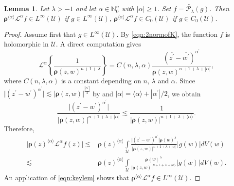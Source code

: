 \documentclass{amsart}
\newtheorem{lemma}[theorem]{Lemma}
\numberwithin{equation}{section}
\newcommand{\bfL}{\mathcal{L}}
\newcommand{\calU}{\mathcal{U}}
\newcommand{\bfrho}{\boldsymbol{\rho}}
\begin{document}
\begin{lemma}\label{lem:P_lambda}
Let $\lambda>-1$ and let $\alpha\in \mathbb{N}_0^n$ with $|\alpha|\geq 1$. Set $f=\widetilde{\mathcal{P}_\lambda}(g)$. 
Then $\bfrho^{\langle \alpha \rangle} \bfL^{\alpha} f\in L^{\infty}(\calU)$ if $g\in L^{\infty}(\calU)$,
 $\bfrho^{\langle \alpha \rangle} \bfL^{\alpha} f\in C_0(\calU)$ if  $g\in C_0(\calU)$.
\end{lemma}
\begin{proof}
Assume first that $g\in L^{\infty}(\calU)$. By \eqref{eqn:2normofK}, the function $f$ is holomorphic in $\calU$.  
A direct computation gives
\[
\bfL^{\alpha} \left\{\frac {1}{\bfrho(z,w)^{n+1+\lambda}} \right\}  = C(n,\lambda,\alpha)
\frac {\left(\overline{{z}^{\prime}}-\overline{{w}^{\prime}}\right)^{\alpha^{\prime}}}
{\bfrho(z,w)^{n+1+\lambda+|\alpha|}},
\]
where $C(n,\lambda,\alpha)$ is a constant depending on $n$, $\lambda$ and $\alpha$. 
Since $\big|(z^{\prime}-w^{\prime})^{\alpha^{\prime}}\big| \lesssim |\bfrho(z,w)|^{\frac {|\alpha^{\prime}|}{2}}$ by \cite[Lemma 3.2]{LSX22} and $|\alpha|=\langle \alpha \rangle+|\alpha^{\prime}|/2$, we obtain
\begin{equation*}\label{eq:ptwsest}
\frac{ \big|(z^{\prime}-w^{\prime})^{\alpha^{\prime}}\big|}{|\bfrho(z,w)|^{n+1+\lambda+|\alpha|}} 
\lesssim \frac{1}{|\bfrho(z,w)|^{n+1+\lambda+\langle \alpha \rangle}}.
\end{equation*}
Therefore,
\begin{align*}
\big|\bfrho(z)^{\langle \alpha \rangle} \bfL^{\alpha} f(z)\big|
\lesssim& \bfrho(z)^{\langle \alpha \rangle}
\int\limits_{\calU} \frac { \big|(z^{\prime}-w^{\prime})^{\alpha^{\prime}}\big| \bfrho(w)^{\lambda}}
{|\bfrho(z,w)|^{n+1+\lambda+|\alpha|}} |g(w)| dV(w)\\
\lesssim&  \bfrho(z)^{\langle \alpha \rangle}
\int\limits_{\calU} \frac { \bfrho(w)^{\lambda}}
{|\bfrho(z,w)|^{n+1+\lambda+\langle \alpha \rangle}} |g(w)| dV(w).
\end{align*}
An application of \eqref{eqn:keylem} shows that $\bfrho^{\langle \alpha \rangle} \bfL^{\alpha} f\in L^{\infty}(\calU)$. 


\end{proof}
\end{document}
